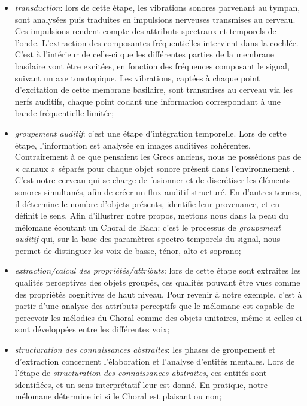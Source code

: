 \begin{itemize}

\item \emph{transduction}: lors de cette étape, les vibrations sonores parvenant au tympan, sont analysées puis traduites en impulsions nerveuses transmises au cerveau. Ces impulsions rendent compte des attributs spectraux et temporels de l'onde. L'extraction des composantes fréquentielles intervient dans la cochlée. C'est à l'intérieur de celle-ci que les différentes parties de la membrane basilaire vont être excitées, en fonction des fréquences composant le signal, suivant un axe tonotopique. Les vibrations, captées à chaque point d’excitation de cette membrane basilaire, sont transmises au cerveau via les nerfs auditifs, chaque point codant une information correspondant à une bande fréquentielle limitée; 
\item \emph{groupement auditif}: c'est une étape d'intégration temporelle. Lors de cette étape, l'information est analysée en images auditives cohérentes. Contrairement à ce que pensaient les Grecs anciens, nous ne possédons pas de « canaux » séparés pour chaque objet sonore présent dans l'environnement \citep{yost1994fundamentals}. C'est notre cerveau qui se charge de fusionner et de discrétiser les éléments sonores simultanés, afin de créer un flux auditif structuré. En d'autres termes, il détermine le nombre d'objets présents, identifie leur provenance, et en définit le sens. Afin d'illustrer notre propos, mettons nous dans la peau du mélomane écoutant un Choral de Bach: c'est le processus de \emph{groupement auditif} qui, sur la base des paramètres spectro-temporels du signal, nous permet de distinguer les voix de basse, ténor, alto et soprano;
\item \emph{extraction/calcul des propriétés/attributs}: lors de cette étape sont extraites les qualités perceptives des objets groupés, ces qualités pouvant être vues comme des propriétés cognitives de haut niveau. Pour revenir à notre exemple, c'est à partir d'une analyse des attributs perceptifs que le mélomane est capable de percevoir les mélodies du Choral comme des objets unitaires, même si celles-ci sont développées entre les différentes voix;
\item \emph{structuration des connaissances abstraites}: les phases de groupement et d'extraction concernent l'élaboration et l'analyse d'entités mentales. Lors de l'étape de \emph{structuration des connaissances abstraites}, ces entités sont identifiées, et un sens interprétatif leur est donné. En pratique, notre mélomane détermine ici si le Choral est plaisant ou non;

\end{itemize}
